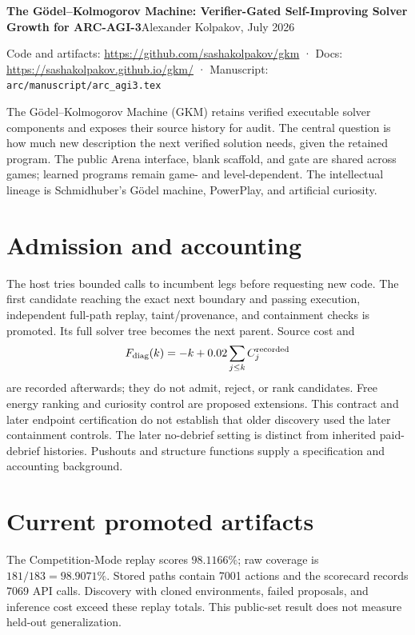\documentclass[10pt]{article}
\begin{document}
\small

{\Large\bfseries The G\"odel--Kolmogorov Machine: Verifier-Gated Self-Improving Solver Growth for ARC-AGI-3}\hfill {\normalsize Alexander Kolpakov, July 2026}

{\small Code and artifacts: \url{https://github.com/sashakolpakov/gkm} \;·\;
Docs: \url{https://sashakolpakov.github.io/gkm/} \;·\;
Manuscript: \texttt{arc/manuscript/arc\_agi3.tex}}

The G\"odel--Kolmogorov Machine (GKM) retains verified executable solver components
and exposes their source history for audit. The central question is how much new
description the next verified solution needs, given the retained program. The public Arena
interface, blank scaffold, and gate are shared across games; learned programs remain
game- and level-dependent. The intellectual lineage is Schmidhuber's G\"odel machine,
PowerPlay, and artificial curiosity.

\section*{Admission and accounting}
The host tries bounded calls to incumbent legs before requesting new code. The first
candidate reaching the exact next boundary and passing execution, independent full-path
replay, taint/provenance, and containment checks is promoted. Its full solver tree becomes
the next parent. Source cost and
\[
 F_{\rm diag}(k)=-k+0.02\sum_{j\le k}C_j^{\rm recorded}
\]
are recorded afterwards; they do not admit, reject, or rank candidates. Free energy
ranking and curiosity control are proposed extensions. This contract and later
endpoint certification do not establish that older discovery used the later containment
controls. The later no-debrief setting is distinct from inherited paid-debrief histories.
Pushouts and structure functions supply a specification and accounting background.

\section*{Current promoted artifacts}
\begin{center}
\small

\end{center}

The Competition-Mode replay scores $98.1166\%$; raw coverage is $181/183=98.9071\%$.
Stored paths contain 7001 actions and the scorecard records 7069 API calls. Discovery
with cloned environments, failed proposals, and inference cost exceed these replay
totals. This public-set result does not measure held-out generalization.
\end{document}
